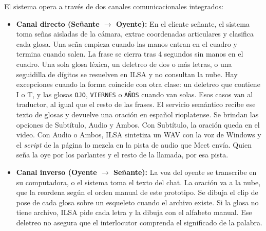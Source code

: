 El sistema opera a través de dos canales comunicacionales integrados:
\begin{itemize}
    \item \textbf{Canal directo (Señante $\rightarrow$ Oyente):} En el cliente señante, el sistema toma señas aisladas de la cámara, extrae coordenadas articulares y clasifica cada glosa. Una seña empieza cuando las manos entran en el cuadro y termina cuando salen. La frase se cierra tras 4 segundos sin manos en el cuadro. Una sola glosa léxica, un deletreo de dos o más letras, o una seguidilla de dígitos se resuelven en ILSA y no consultan la nube. Hay excepciones cuando la forma coincide con otra clase: un deletreo que contiene I o T, y las glosas \texttt{OJO}, \texttt{VIERNES} o \texttt{AÑOS} cuando van solas. Esos casos van al traductor, al igual que el resto de las frases. El servicio semántico recibe ese texto de glosas y devuelve una oración en español rioplatense. Se brindan las opciones de Subtítulo, Audio y Ambos. Con Subtítulo, la oración queda en el video. Con Audio o Ambos, ILSA sintetiza un WAV con la voz de Windows y el \textit{script} de la página lo mezcla en la pista de audio que Meet envía. Quien seña la oye por los parlantes y el resto de la llamada, por esa pista.

    \item \textbf{Canal inverso (Oyente $\rightarrow$ Señante):} La voz del oyente se transcribe en su computadora, o el sistema toma el texto del chat. La oración va a la nube, que la reordena según el orden manual de este prototipo. Se dibuja el clip de pose de cada glosa sobre un esqueleto cuando el archivo existe. Si la glosa no tiene archivo, ILSA pide cada letra y la dibuja con el alfabeto manual. Ese deletreo no asegura que el interlocutor comprenda el significado de la palabra.
\end{itemize}


